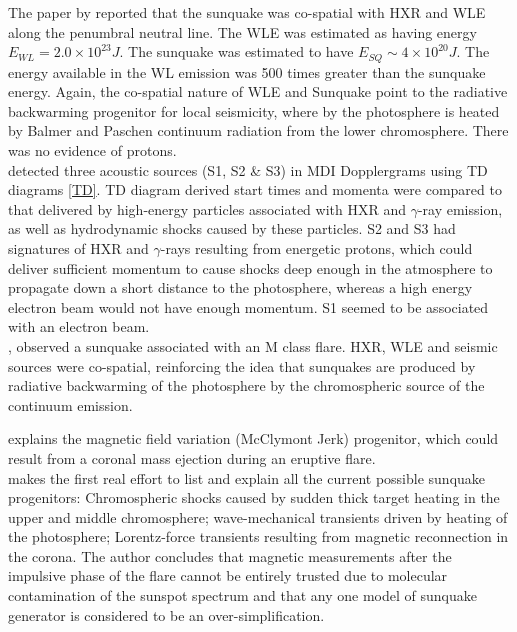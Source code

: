 \documentclass[11pt]{article}
\begin{document}
The paper by \cite{2007MNRAS.374.1155M} reported that the sunquake was co-spatial with HXR and WLE along the penumbral neutral line. The WLE was estimated as having energy $E_{WL}=2.0\times10^{23}J$. The sunquake was estimated to have $E_{SQ}\sim4\times10^{20}J$. The energy available in the WL emission was 500 times greater than the sunquake energy. Again, the co-spatial nature of WLE and Sunquake point to the radiative backwarming progenitor for local seismicity, where by the photosphere is heated by Balmer and Paschen continuum radiation from the lower chromosphere. There was no evidence of protons.  \\

\cite{2007ApJ...664..573Z} detected three acoustic sources (S1, S2 \& S3) in MDI Dopplergrams using TD diagrams \ref{TD}. TD diagram derived start times and momenta were compared to that delivered by high-energy particles associated with HXR and $\gamma$-ray emission, as well as hydrodynamic shocks caused by these particles. S2 and S3 had signatures of HXR and $\gamma$-rays resulting from energetic protons, which could deliver sufficient momentum to cause shocks deep enough in the atmosphere to propagate down a short distance to the photosphere, whereas a high energy electron beam would not have enough momentum. S1 seemed to be associated with an electron beam.\\

\cite{2007SoPh..245..121M}, observed a sunquake associated with an M class flare. HXR, WLE and seismic sources were co-spatial, reinforcing the idea that sunquakes are produced by radiative backwarming of the photosphere by the chromospheric source of the continuum emission. 


\cite{2008ASPC..383..221H} explains the magnetic field variation (McClymont Jerk) progenitor, which could result from  a coronal mass ejection during an eruptive flare.  \\

\cite{2008SoPh..251..627L} makes the first real effort to list and explain all the current possible sunquake progenitors:
Chromospheric shocks caused by sudden thick target heating in the upper and middle chromosphere; wave-mechanical transients driven by heating of the photosphere; Lorentz-force transients resulting from magnetic reconnection in the corona. The author concludes that magnetic measurements after the impulsive phase of the flare cannot be entirely trusted due to molecular contamination of the sunspot spectrum and that any one model of sunquake generator is considered to be an over-simplification. \\
\end{document}
